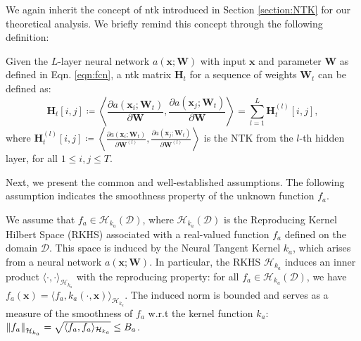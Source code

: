We again inherit the concept of \acf{ntk} introduced in Section \ref{section:NTK} for our theoretical analysis. We briefly remind this concept through the following definition: 
\begin{definition}
    \label{def:neural-cbo_ntk}
    Given the $L$-layer neural network $a(\mathbf{x}; \mathbf{W})$ with input $\mathbf{x}$ and parameter $\mathbf{W}$ as defined in Eqn. \ref{eqn:fcn}, a \ac{ntk} matrix $\mathbf{H}_t$ for a sequence of weights {$\mathbf{W}_t$} can be defined as:
    \begin{equation*}
        \mathbf{H}_t [i, j] \coloneqq \left \langle \frac{\partial a(\mathbf{x}_i; \mathbf{W}_t)}{\partial \mathbf{W}},  \frac{\partial a(\mathbf{x}_j; \mathbf{W}_t)}{\partial \mathbf{W}}\right \rangle = \sum_{l=1}^L \mathbf{H}^{(l)}_t[i, j],
    \end{equation*}
    where $\mathbf{H}^{(l)}_t [i, j] \coloneqq \left \langle \frac{\partial a(\mathbf{x}_i; \mathbf{W}_t)}{\partial \mathbf{W}^{(l)}},  \frac{\partial a(\mathbf{x}_j; \mathbf{W}_t)}{\partial \mathbf{W}^{(l)}}\right \rangle$ is the NTK from the $l$-th hidden layer, for all $1 \le i, j \le T$.
\end{definition}


Next, we present the common and well-established assumptions. The following assumption indicates the smoothness property of the unknown function $f_a$.
\begin{assumption}
\label{assumption:rkhs}
We assume that $f_a \in \mathcal{H}_{k_a}(\mathcal{D})$, where $\mathcal{H}_{k_a}(\mathcal{D})$ is the Reproducing Kernel Hilbert Space (RKHS) associated with a real-valued function $f_a$ defined on the domain $\mathcal{D}$. This space is induced by the Neural Tangent Kernel $k_a$, which arises from a neural network $a(\mathbf{x}; \mathbf{W})$. In particular, the RKHS $\mathcal{H}_{k_a}$ induces an inner product $\langle \cdot, \cdot \rangle_{\mathcal{H}_{k_a}} $ with the reproducing property: for all $f_a \in \mathcal{H}_{k_a}(\mathcal{D})$, we have 
$f_a(\mathbf{x}) = \langle f_a, k_a(\cdot, \mathbf{x}) \rangle_{\mathcal{H}_{k_a}}$. 
The induced norm is bounded and 
serves as a measure of the smoothness of $f_a$ w.r.t the kernel function $k_a$: $\norm{f_a}_{\mathcal{H}_{k_a}} = \sqrt{\langle f_a, f_a \rangle_{\mathcal{H}_{k_a}}} \leq B_a$. 
\end{assumption}


